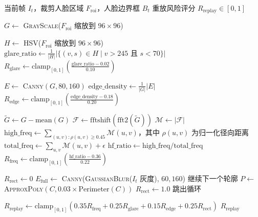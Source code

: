 \documentclass[UTF8]{heuthesis}
\begin{document}
\begin{algorithm}[htbp]
\caption{屏幕重放风险分析}
\begin{algorithmic}[1]
\Require 当前帧 $I_t$，裁剪人脸区域 $F_{\mathrm{roi}}$，人脸边界框 $B_t$
\Ensure 重放风险评分 $R_{\mathrm{replay}} \in [0, 1]$

\State $G \gets$ \textsc{GrayScale}($F_{\mathrm{roi}}$ 缩放到 $96 \times 96$)

\Statex
{}
\State $H \gets$ \textsc{HSV}($F_{\mathrm{roi}}$ 缩放到 $96 \times 96$)
\State $\text{glare\_ratio} \gets \frac{1}{|H|} |\{(v, s) \in H \mid v > 245 \text{ 且 } s < 70\}|$
\State $R_{\mathrm{glare}} \gets \text{clamp}_{[0,1]}\left(\frac{\text{glare\_ratio} - 0.02}{0.10}\right)$

\Statex
{}
\State $E \gets$ \textsc{Canny}$(G, 80, 160)$
\State $\text{edge\_density} \gets \frac{1}{|G|} |E|$
\State $R_{\mathrm{edge}} \gets \text{clamp}_{[0,1]}\left(\frac{\text{edge\_density} - 0.18}{0.20}\right)$

\Statex
{}
\State $\tilde{G} \gets G - \text{mean}(G)$
\State $\mathcal{F} \gets \text{fftshift}(\text{fft2}(\tilde{G}))$
\State $\mathcal{M} \gets |\mathcal{F}|$
\State $\text{high\_freq} \gets \sum\limits_{(u,v): \rho(u,v) \geq 0.45} \mathcal{M}(u,v)$，其中 $\rho(u,v)$ 为归一化径向距离
\State $\text{total\_freq} \gets \sum\limits_{u,v} \mathcal{M}(u,v) + \epsilon$
\State $\text{hf\_ratio} \gets \text{high\_freq} / \text{total\_freq}$
\State $R_{\mathrm{freq}} \gets \text{clamp}_{[0,1]}\left(\frac{\text{hf\_ratio} - 0.36}{0.22}\right)$

\Statex
{}
\State $R_{\mathrm{rect}} \gets 0$
\State $E_{\mathrm{full}} \gets$ \textsc{Canny}(\textsc{GaussianBlur}($I_t$ 灰度), $60, 160$)
        \State 继续下一个轮廓
    \endIf
    \State $P \gets$ \textsc{ApproxPoly}$(C, 0.03 \times \text{Perimeter}(C))$
        \State $R_{\mathrm{rect}} \gets 1.0$
        \State 跳出循环
    \endIf
\endFor

\Statex
{}
\State $R_{\mathrm{replay}} \gets \text{clamp}_{[0,1]}(0.35 R_{\mathrm{freq}} + 0.25 R_{\mathrm{glare}} + 0.15 R_{\mathrm{edge}} + 0.25 R_{\mathrm{rect}})$
\State \Return $R_{\mathrm{replay}}$
\end{algorithmic}
\label{alg:replay}
\end{algorithm}
\end{document}
